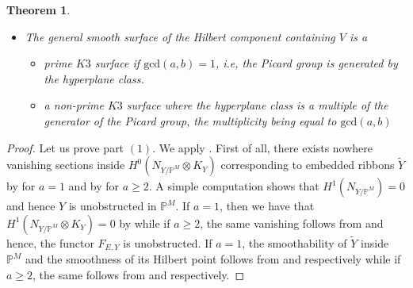 \documentclass[11pt,twoside]{amsart}
\theoremstyle{plain}
\numberwithin{equation}{section}
\newtheorem{theorem}{Theorem}[section]
\theoremstyle{definition}
\begin{document}
\begin{theorem}
\begin{itemize}
    \item[(3)] The general smooth surface of the Hilbert component containing $V$ is a 
    \begin{itemize}
        \item[(a)] prime $K3$ surface if $\textrm{gcd}(a,b) = 1$, i.e, the Picard group is generated by the hyperplane class.
        \item[(b)] a non-prime $K3$ surface where the hyperplane class is a multiple of the generator of the Picard group, the multiplicity being equal to $\textrm{gcd}(a,b)$
    \end{itemize}
\end{itemize}

\end{theorem}

\begin{proof}
Let us prove part $(1)$. We apply \cite[Theorem $2.10$]{BGM24}. First of all, there exists nowhere vanishing sections inside $H^0(N_{Y/\mathbb{P}^M} \otimes K_Y)$ corresponding to embedded ribbons $\widetilde{Y}$ by \cite[Theorem $1.7$]{GP97} for $a = 1$ and  by \cite[Theorem $3.1$]{BMR21} for $a \geq 2$. A simple computation  shows that $H^1(N_{Y/\mathbb{P}^M}) = 0$ and hence $Y$ is unobstructed in $\mathbb{P}^M$. If $a = 1$, then we have that $H^1(N_{Y/\mathbb{P}^M} \otimes K_Y) = 0$ by \cite[Theorem $1.7$]{GP97} while if $a \geq 2$, the same vanishing follows from \cite[Lemma $2.7$, $(2)$]{BMR21} and hence, the functor $F_{E, Y}$ is unobstructed. If $a = 1$, the smoothability of $\widetilde{Y}$ inside $\mathbb{P}^M$ and the smoothness of its Hilbert point follows from \cite[Corollary $2.9$]{GGP13} and \cite[Theorem $4.1$]{GP97} respectively while if $a \geq 2$, the same follows from \cite[Theorem $4.1$]{BMR21} and \cite[Theorem $5.1$]{BMR21} respectively. 

\end{proof}
\end{document}
